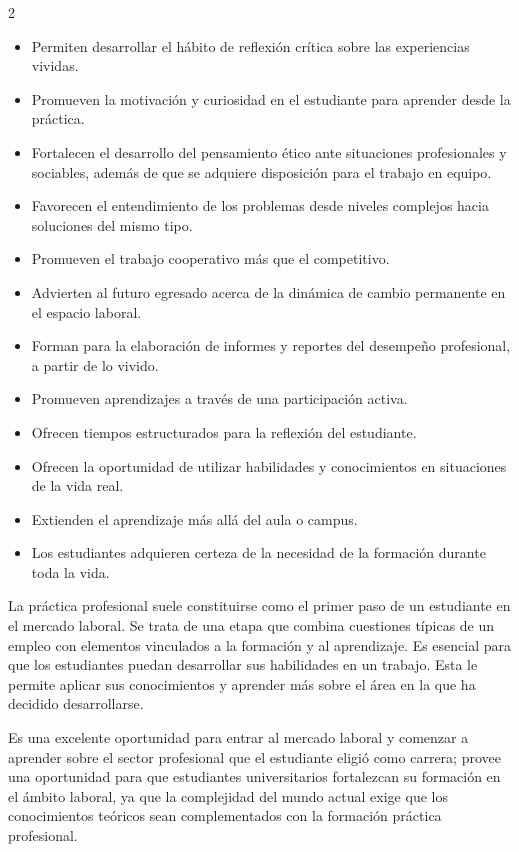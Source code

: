 \documentclass[12pt,spanish,Letterpaper,openany]{book}
\begin{document}
\begin {multicols}{2}
\begin{itemize}
\item
  Permiten desarrollar el hábito de reflexión crítica sobre las experiencias vividas.
\item
  Promueven la motivación y curiosidad en el estudiante para aprender desde la práctica.
\item
  Fortalecen el desarrollo del pensamiento ético ante situaciones profesionales y sociables, además de que se adquiere disposición para el trabajo en equipo.
\item
  Favorecen el entendimiento de los problemas desde niveles complejos hacia soluciones del mismo tipo.
\item
  Promueven el trabajo cooperativo más que el competitivo.
\item
  Advierten al futuro egresado acerca de la dinámica de cambio permanente en el espacio laboral.
\item
  Forman para la elaboración de informes y reportes del desempeño profesional, a partir de lo vivido.
\item
  Promueven aprendizajes a través de una participación activa.
\item
  Ofrecen tiempos estructurados para la reflexión del estudiante.
\item
  Ofrecen la oportunidad de utilizar habilidades y conocimientos en situaciones de la vida real.
\item
  Extienden el aprendizaje más allá del aula o campus.
\item
  Los estudiantes adquieren certeza de la necesidad de la formación durante toda la vida.
\end{itemize}

La práctica profesional suele constituirse como el primer paso de un estudiante en el mercado laboral. Se trata de una etapa que combina cuestiones típicas de un empleo con elementos vinculados a la formación y al aprendizaje. Es esencial para que los estudiantes puedan desarrollar sus habilidades en un trabajo. Esta le permite aplicar sus conocimientos y aprender más sobre el área en la que ha decidido desarrollarse.

Es una excelente oportunidad para entrar al mercado laboral y comenzar a aprender sobre el sector profesional que el estudiante eligió como carrera; provee una oportunidad para que estudiantes universitarios fortalezcan su formación en el ámbito laboral, ya que la complejidad del mundo actual exige que los conocimientos teóricos sean complementados con la formación práctica profesional.


\end{multicols}
\end{document}
